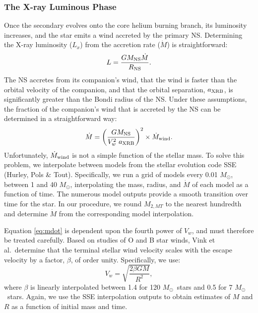 \documentclass[12pt, preprint]{aastex}
\newcommand{\Msun}{\ifmmode {M_{\odot}}\else${M_{\odot}}$\fi}
\begin{document}
\subsubsection{The X-ray Luminous Phase} \label{sec:trans_XRB}

Once the secondary evolves onto the core helium burning branch, its luminosity increases, and the star emits a wind accreted by the primary NS. Determining the X-ray luminosity ($L_x$) from the accretion rate ($\dot{M}$) is straightforward: 
\begin{equation}
L = \frac{G M_{\rm NS} \dot{M}}{R_{\rm NS}}.
\end{equation}
The NS accretes from its companion's wind, that the wind is faster than the orbital velocity of the companion, and that the orbital separation, $a_{\rm XRB}$, is significantly greater than the Bondi radius of the NS. Under these assumptions, the fraction of the companion's wind that is accreted by the NS can be determined in a straightforward way:
\begin{equation}
\dot{M} = \left( \frac{G M_{\rm NS}}{V_w^2\ a_{\rm XRB}} \right)^2 \times \dot{M}_{\rm wind}. \label{eq:mdot}
\end{equation}
Unfortunately, $\dot{M}_{\rm wind}$ is not a simple function of the stellar mass. To solve this problem, we interpolate between models from the stellar evolution code SSE (Hurley, Pols \& Tout). Specifically, we run a grid of models every 0.01 \Msun, between 1 and 40 \Msun, interpolating the mass, radius, and $\dot{M}$ of each model as a function of time. The numerous model outputs provide a smooth transition over time for the star. In our procedure, we round $M_{2,MT}$ to the nearest hundredth and determine $\dot{M}$ from the corresponding model interpolation.


Equation \ref{eq:mdot} is dependent upon the fourth power of $V_w$, and must therefore be treated carefully. Based on studies of O and B star winds, Vink et al.\ determine that the terminal stellar wind velocity scales with the escape velocity by a factor, $\beta$, of order unity. Specifically, we use:
\begin{equation}
V_w = \sqrt{\frac{2 \beta G M}{R^2}},
\end{equation}
where $\beta$ is linearly interpolated between 1.4 for 120 \Msun\ stars and 0.5 for 7 \Msun\ stars. Again, we use the SSE interpolation outputs to obtain estimates of $M$ and $R$ as a function of initial mass and time.
\end{document}
